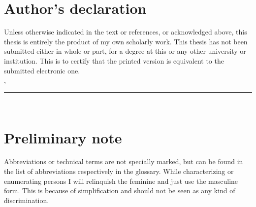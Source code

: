 \thispagestyle{empty}

\section*{Author's declaration}
\vspace*{2em}
Unless otherwise indicated in the text or references, or acknowledged above, this thesis is entirely the product of my own scholarly work. This thesis has not been submitted either in whole or part, for a degree at this or any other university or institution. This is to certify that the printed version is equivalent to the submitted electronic one.
\vspace{2em}\\
\abgabeort, \datumAbgabe
\vspace{3em}\\
\rule{6cm}{0.4pt}\\
\autor
\vspace*{2em}

\section*{Preliminary note}

\vspace*{2em}
Abbreviations or technical terms are not specially marked, but can be found in the list of abbreviations respectively in the glossary. While characterizing or enumerating persons I will relinquish the feminine and just use the masculine form. This is because of simplification and should not be seen as any kind of discrimination. 


